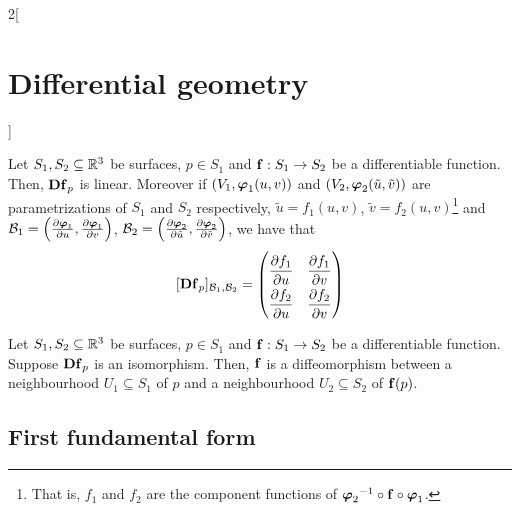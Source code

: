 \documentclass[../../../main.tex]{subfiles}
\begin{document}
\begin{multicols}{2}[\section{Differential geometry}]
\begin{definition}
  \end{definition}
  \begin{proposition}
    Let $S_1,S_2\subseteq\mathbb{R}^3$ be surfaces,  $p\in S_1$ and $\boldsymbol{\mathrm{f}}:S_1\rightarrow S_2$ be a differentiable function. Then, $\boldsymbol{\mathrm{Df}}_p$ is linear. Moreover if $(V_1,\boldsymbol{\mathrm{\varphi}}_1(u,v))$ and $(V_2,\boldsymbol{\mathrm{\varphi}}_2(\tilde{u},\tilde{v}))$ are parametrizations of $S_1$ and $S_2$ respectively, $\tilde{u}=f_1(u,v)$, $\tilde{v}=f_2(u,v)$\footnote{That is, $f_1$ and $f_2$ are the component functions of ${\boldsymbol{\mathrm{\varphi}}_2}^{-1}\circ\boldsymbol{\mathrm{f}}\circ\boldsymbol{\mathrm{\varphi}}_1$.} and $\mathcal{B}_1=\left(\pdv{\boldsymbol{\mathrm{\varphi}}_1}{u},\pdv{\boldsymbol{\mathrm{\varphi}}_1}{v}\right)$, $\mathcal{B}_2=\left(\pdv{\boldsymbol{\mathrm{\varphi}}_2}{\tilde{u}},\pdv{\boldsymbol{\mathrm{\varphi}}_2}{\tilde{v}}\right)$, we have that $$[\vf{Df}_p]_{\mathcal{B}_1,\mathcal{B}_2}=
      \renewcommand\arraystretch{2}
      \begin{pmatrix}
        \displaystyle\pdv{f_1}{u}({\vf{\varphi}}^{-1}(p)) & \displaystyle\pdv{f_1}{v}({\vf{\varphi}}^{-1}(p)) \\
        \displaystyle\pdv{f_2}{u}({\vf{\varphi}}^{-1}(p)) & \displaystyle\pdv{f_2}{v}({\vf{\varphi}}^{-1}(p))
      \end{pmatrix}$$
  \end{proposition}
  \begin{proposition}
    Let $S_1,S_2\subseteq\mathbb{R}^3$ be surfaces, $p\in S_1$ and $\boldsymbol{\mathrm{f}}:S_1\rightarrow S_2$ be a differentiable function. Suppose $\boldsymbol{\mathrm{Df}}_p$ is an isomorphism. Then, $\boldsymbol{\mathrm{f}}$ is a diffeomorphism between a neighbourhood $U_1\subseteq S_1$ of $p$ and a neighbourhood $U_2\subseteq S_2$ of $\boldsymbol{\mathrm{f}}(p)$.
  \end{proposition}
  \subsection{First fundamental form}

\end{multicols}
\end{document}

